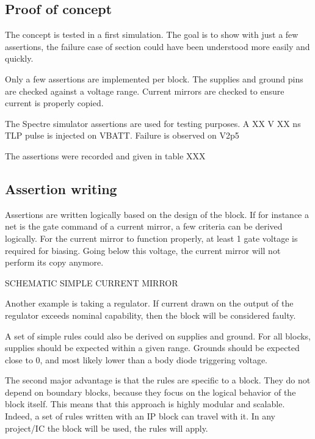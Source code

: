 \subsection{Proof of concept}

The concept is tested in a first simulation.
The goal is to show with just a few assertions, the failure case of section \label{sec:failure-case-study} could have been understood more easily and quickly.

Only a few assertions are implemented per block.
The supplies and ground pins are checked against a voltage range.
Current mirrors are checked to ensure current is properly copied.

The Spectre simulator assertions are used for testing purposes.
A XX V XX ns TLP pulse is injected on VBATT.
Failure is observed on V2p5

The assertions were recorded and given in table XXX


\subsection{Assertion writing}

Assertions are written logically based on the design of the block.
If for instance a net is the gate command of a current mirror, a few criteria can be derived logically.
For the current mirror to function properly, at least 1 gate voltage is required for biasing.
Going below this voltage, the current mirror will not perform its copy anymore.

SCHEMATIC SIMPLE CURRENT MIRROR

Another example is taking a regulator.
If current drawn on the output of the regulator exceeds nominal capability, then the block will be considered faulty.

A set of simple rules could also be derived on supplies and ground.
For all blocks, supplies should be expected within a given range.
Grounds should be expected close to 0, and most likely lower than a body diode triggering voltage.

The second major advantage is that the rules are specific to a block.
They do not depend on boundary blocks, because they focus on the logical behavior of the block itself.
This means that this approach is highly modular and scalable.
Indeed, a set of rules written with an IP block can travel with it.
In any project/IC the block will be used, the rules will apply.

